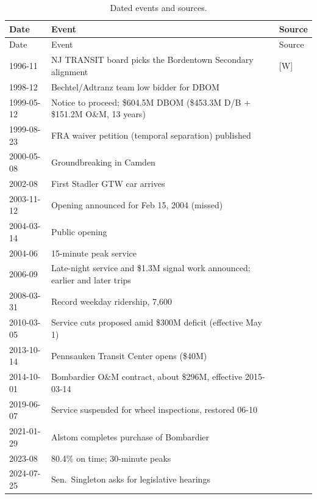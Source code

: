 \documentclass[11pt]{article}
\newcommand{\flag}[1]{\textcolor{sb}{\textsf{[#1]}}}
\begin{document}
{\small
\begin{longtable}{@{}p{2.1cm}p{9.6cm}p{2.9cm}@{}}
\caption{Dated events and sources.}\label{tab:timeline}\\
\toprule Date & Event & Source \\ \midrule \endfirsthead
\toprule Date & Event & Source \\ \midrule \endhead
1996-11 & NJ TRANSIT board picks the Bordentown Secondary alignment & \flag{W} \citep{wiki_riverline} \\
1998-12 & Bechtel/Adtranz team low bidder for DBOM & \citep{bechtel1998} \\
1999-05-12 & Notice to proceed; \$604.5M DBOM (\$453.3M D/B + \$151.2M O\&M, 13 years) & \citep{njdot2000groundbreaking} \\
1999-08-23 & FRA waiver petition (temporal separation) published & \citep{fr1999waiver} \\
2000-05-08 & Groundbreaking in Camden & \citep{njdot2000groundbreaking} \\
2002-08 & First Stadler GTW car arrives & \citep{pesky2025} \\
2003-11-12 & Opening announced for Feb 15, 2004 (missed) & \citep{njt2003debut} \\
2004-03-14 & Public opening & \citep{camdenhistory2004} \\
2004-06 & 15-minute peak service & \citep{njt2004fifteen} \\
2006-09 & Late-night service and \$1.3M signal work announced; earlier and later trips & \citep{njt2006latenight,njt2006earlier} \\
2008-03-31 & Record weekday ridership, 7{,}600 & \citep{njt2008ridership} \\
2010-03-05 & Service cuts proposed amid \$300M deficit (effective May 1) & \citep{njt2010fare} \\
2013-10-14 & Pennsauken Transit Center opens (\$40M) & \citep{inquirer2013pennsauken} \\
2014-10-01 & Bombardier O\&M contract, about \$296M, effective 2015-03-14 & \citep{masstransit2014bombardier} \\
2019-06-07 & Service suspended for wheel inspections, restored 06-10 & \citep{cbs2019wheels} \\
2021-01-29 & Alstom completes purchase of Bombardier & \citep{alstom2021} \\
2023-08 & 80.4\% on time; 30-minute peaks & \citep{inquirer2023} \\
2024-07-25 & Sen.~Singleton asks for legislative hearings & \citep{insidernj2024} \\

\end{longtable}}
\end{document}

